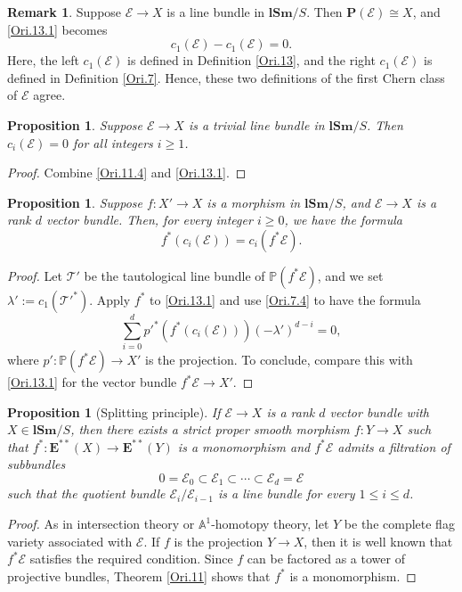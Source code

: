 \documentclass[11pt, a4paper]{amsart}
\newtheorem{prop}[thm]{Proposition}
\theoremstyle{definition}
\newtheorem{rmk}[thm]{Remark}
\numberwithin{equation}{subsection}
\renewcommand{\P}{\mathbb{P}}
\newcommand{\A}{\mathbb{A}}
\newcommand{\lSm}{\mathbf{lSm}}
\def\bP{\mathbf{P}}
\newcommand{\cE}{\mathcal{E}}
\newcommand{\cT}{\mathcal{T}}
\newcommand{\ringE}{\mathbf{E}}
\begin{document}
\begin{rmk}
\label{Ori.14}
Suppose $\cE\to X$ is a line bundle in $\lSm/S$.
Then $\bP(\cE)\cong X$, and \eqref{Ori.13.1} becomes
\[
c_1(\cE)-c_1(\cE)=0.
\]
Here, the left $c_1(\cE)$ is defined in Definition \ref{Ori.13}, and the right $c_1(\cE)$ is defined in Definition \ref{Ori.7}.
Hence, these two definitions of the first Chern class of $\cE$ agree.
\end{rmk}

\begin{prop}
\label{Ori.50}
Suppose $\cE\to X$ is a trivial line bundle in $\lSm/S$.
Then $c_i(\cE)=0$ for all integers $i\geq 1$.
\end{prop}
\begin{proof}
Combine \eqref{Ori.11.4} and \eqref{Ori.13.1}.
\end{proof}

\begin{prop}
\label{Ori.18}
Suppose $f\colon X'\to X$ is a morphism in $\lSm/S$, 
and $\cE\to X$ is a rank $d$ vector bundle.
Then, for every integer $i\geq 0$, we have the formula
\[
f^*(c_i(\cE))=c_i(f^*\cE).
\]
\end{prop}
\begin{proof}
Let $\cT'$ be the tautological line bundle of $\P(f^*\cE)$, and we set $\lambda':=c_1(\cT'^*)$.
Apply $f^*$ to \eqref{Ori.13.1} and use \eqref{Ori.7.4} to have the formula
\[
\sum_{i=0}^d p'^* (f^*(c_i(\cE)))(-\lambda')^{d-i}=0,
\]
where $p'\colon \P(f^*\cE)\to X'$ is the projection.
To conclude, compare this with \eqref{Ori.13.1} for the vector bundle $f^*\cE\to X'$.
\end{proof}


\begin{prop}
[Splitting principle]
\label{Ori.19}
If $\cE\to X$ is a rank $d$ vector bundle with $X\in \lSm/S$, then there exists a strict proper smooth morphism $f\colon Y\to X$ such that $f^*\colon \ringE^{**}(X)\to \ringE^{**}(Y)$ is a monomorphism and $f^*\cE$ admits a filtration of subbundles
\[
0=\cE_0\subset \cE_1 \subset \cdots \subset \cE_d=\cE
\]
such that the quotient bundle $\cE_i/\cE_{i-1}$ is a line bundle for every $1\leq i\leq d$.
\end{prop}
\begin{proof}
As in intersection theory or $\A^1$-homotopy theory, let $Y$ be the complete flag variety associated with $\cE$.
If $f$ is the projection $Y\to X$, then it is well known that $f^*\cE$ satisfies the required condition.
Since $f$ can be factored as a tower of projective bundles, Theorem \ref{Ori.11} shows that $f^*$ is a monomorphism.
\end{proof}
\end{document}
